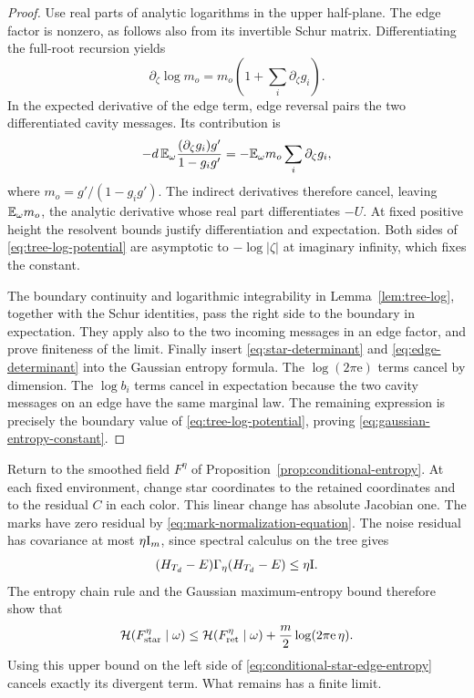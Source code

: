 \begin{proof}
Use real parts of analytic logarithms in the upper half-plane.
The edge factor is nonzero, as follows also from its invertible
Schur matrix.  Differentiating the full-root recursion yields
\[
 \partial_\zeta\log m_o
   =m_o\left(1+\sum_i\partial_\zeta g_i\right).
\]
In the expected derivative of the edge term, edge reversal pairs
the two differentiated cavity messages.  Its contribution is
\[
 -d\,\mathbb E_\omega\frac{(\partial_\zeta g_i)g'}{1-g_i g'}
 =-\mathbb E_\omega m_o\sum_i\partial_\zeta g_i,
\]
where \(m_o=g'/(1-g_i g')\).  The indirect derivatives therefore
cancel, leaving \(\mathbb E_\omega m_o\), the analytic derivative whose
real part differentiates \(-U\).  At fixed positive height the
resolvent bounds justify differentiation and expectation.  Both
sides of \eqref{eq:tree-log-potential} are asymptotic to
\(-\log|\zeta|\) at imaginary infinity, which fixes the constant.

The boundary continuity and logarithmic integrability in
Lemma~\ref{lem:tree-log}, together with the Schur identities,
pass the right side to the boundary in expectation.  They apply
also to the two incoming messages in an edge factor, and prove
finiteness of the limit.  Finally insert
\eqref{eq:star-determinant} and \eqref{eq:edge-determinant} into
the Gaussian entropy formula.  The \(\log(2\pi\mathrm e)\)
terms cancel by dimension.  The \(\log b_i\) terms cancel in
expectation because the two cavity messages on an edge have the
same marginal law.  The remaining expression is precisely the
boundary value of \eqref{eq:tree-log-potential}, proving
\eqref{eq:gaussian-entropy-constant}.
\end{proof}

Return to the smoothed field \(F^\eta\) of
Proposition~\ref{prop:conditional-entropy}.  At each fixed
environment, change star coordinates to the retained coordinates
and to the residual \(C\) in each color.  This linear change has
absolute Jacobian one.  The marks have zero residual by
\eqref{eq:mark-normalization-equation}.  The noise residual has
covariance at most \(\eta\mathrm I_m\), since spectral calculus on
the tree gives
\[
 (H_{T_d}-E)\Gamma_\eta(H_{T_d}-E)\le\eta\mathrm I.
\]
The entropy chain rule and the Gaussian maximum-entropy bound
therefore show that
\begin{equation}\label{eq:residual-entropy-bound}
 \mathcal H(F^\eta_{\rm star}\mid\omega)
 \le \mathcal H(F^\eta_{\rm ret}\mid\omega)
           +\frac m2\log(2\pi\mathrm e\,\eta).
\end{equation}
Using this upper bound on the left side of
\eqref{eq:conditional-star-edge-entropy} cancels exactly its
divergent term.  What remains has a finite limit.

